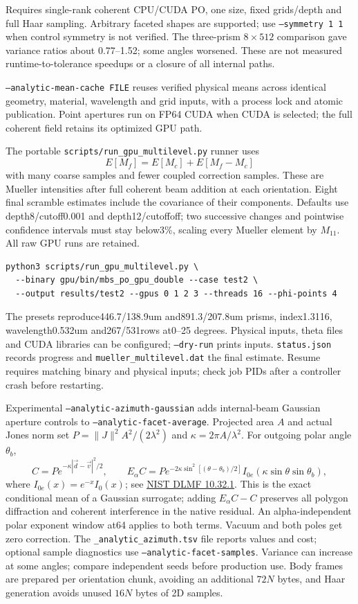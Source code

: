 \documentclass[
  10pt,
  a4paper,
]{article}
\begin{document}
Requires single-rank coherent CPU/CUDA PO, one size, fixed grids/depth and full Haar
sampling. Arbitrary faceted shapes are supported; use \texttt{--symmetry 1 1}
when control symmetry is not verified. The three-prism $8\times512$ comparison
gave variance ratios about 0.77--1.52; some angles worsened. These are not
measured runtime-to-tolerance speedups or a closure of all internal paths.

\texttt{--analytic-mean-cache FILE} reuses verified physical means across
identical geometry, material, wavelength and grid inputs, with a process lock
and atomic publication. Point apertures run on FP64 CUDA when CUDA is selected;
the full coherent field retains its optimized GPU path.

The portable \texttt{scripts/run\_gpu\_multilevel.py} runner uses
\[
 E[M_f]=E[M_c]+E[M_f-M_c]
\]
with many coarse samples and fewer coupled correction samples. These are
Mueller intensities after full coherent beam addition at each orientation.
Eight final scramble estimates include the covariance of their components.
Defaults use depth8/cutoff0.001 and depth12/cutoffoff; two successive changes
and pointwise confidence intervals must stay below3\%, scaling every Mueller
element by $M_{11}$. All raw GPU runs are retained.
\begin{verbatim}
python3 scripts/run_gpu_multilevel.py \
  --binary gpu/bin/mbs_po_gpu_double --case test2 \
  --output results/test2 --gpus 0 1 2 3 --threads 16 --phi-points 4
\end{verbatim}
The presets reproduce446.7/138.9um and891.3/207.8um prisms, index1.3116,
wavelength0.532um and267/531rows at0--25 degrees. Physical inputs, theta
files and CUDA libraries can be configured; \texttt{--dry-run} prints inputs.
\texttt{status.json} records progress and \texttt{mueller\_multilevel.dat}
the final estimate. Resume requires matching binary and physical inputs;
check job PIDs after a controller crash before restarting.

Experimental \texttt{--analytic-azimuth-gaussian} adds internal-beam Gaussian
aperture controls to \texttt{--analytic-facet-average}. Projected area $A$ and
actual Jones norm set $P=\|J\|^2 A^2/(2\lambda^2)$ and
$\kappa=2\pi A/\lambda^2$. For outgoing polar angle $\theta_b$,
\[
 C=P e^{-\kappa|\vec d-\vec v|^2/2},\qquad
 E_\alpha C=P e^{-2\kappa\sin^2[(\theta-\theta_b)/2]}
 I_{0e}(\kappa\sin\theta\sin\theta_b),
\]
where $I_{0e}(x)=e^{-x}I_0(x)$; see
\href{https://dlmf.nist.gov/10.32.E1}{NIST DLMF 10.32.1}.
This is the exact conditional mean of a Gaussian surrogate; adding
$E_\alpha C-C$ preserves all polygon diffraction and coherent interference
in the native residual. An alpha-independent polar exponent window at64
applies to both terms. Vacuum and both poles get zero correction.
The \texttt{\_analytic\_azimuth.tsv} file reports values and cost; optional
sample diagnostics use \texttt{--analytic-facet-samples}. Variance can increase
at some angles; compare independent seeds before production use.
Body frames are prepared per orientation chunk, avoiding an additional
$72N$ bytes, and Haar generation avoids unused $16N$ bytes of 2D samples.
\end{document}
